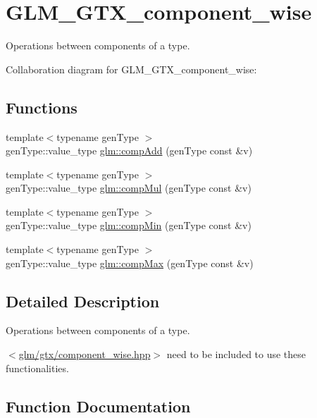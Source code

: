 \hypertarget{group__gtx__component__wise}{}\section{G\+L\+M\+\_\+\+G\+T\+X\+\_\+component\+\_\+wise}
\label{group__gtx__component__wise}


Operations between components of a type.  


Collaboration diagram for G\+L\+M\+\_\+\+G\+T\+X\+\_\+component\+\_\+wise\+:
\subsection*{Functions}
\begin{DoxyCompactItemize}
\item 
{\footnotesize template$<$typename gen\+Type $>$ }\\gen\+Type\+::value\+\_\+type \hyperlink{group__gtx__component__wise_ga70016a744618371aafdb9a6ed8b9ffda}{glm\+::comp\+Add} (gen\+Type const \&v)
\item 
{\footnotesize template$<$typename gen\+Type $>$ }\\gen\+Type\+::value\+\_\+type \hyperlink{group__gtx__component__wise_gac0831fc64d0ce245f7f961d72e1893fd}{glm\+::comp\+Mul} (gen\+Type const \&v)
\item 
{\footnotesize template$<$typename gen\+Type $>$ }\\gen\+Type\+::value\+\_\+type \hyperlink{group__gtx__component__wise_gabe82f26e0f548e09008ad0874af9e837}{glm\+::comp\+Min} (gen\+Type const \&v)
\item 
{\footnotesize template$<$typename gen\+Type $>$ }\\gen\+Type\+::value\+\_\+type \hyperlink{group__gtx__component__wise_ga7570faad7d86649a9a5d766f3e731e89}{glm\+::comp\+Max} (gen\+Type const \&v)
\end{DoxyCompactItemize}


\subsection{Detailed Description}
Operations between components of a type. 

$<$\hyperlink{component__wise_8hpp}{glm/gtx/component\+\_\+wise.\+hpp}$>$ need to be included to use these functionalities. 

\subsection{Function Documentation}
\hypertarget{group__gtx__component__wise_ga70016a744618371aafdb9a6ed8b9ffda}{}
